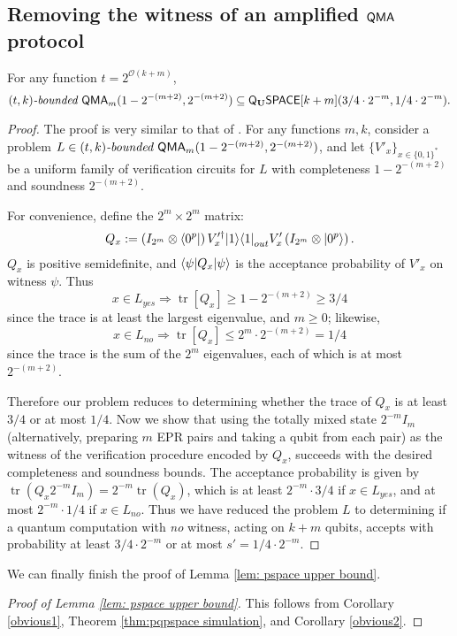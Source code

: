 \documentclass[a4paper,UKenglish]{lipics-v2016}
\newcommand\QMA{{\sf{QMA}}}
\newcommand\bddQMA[5]{{\left(#1,#2\right)}\textit{-bounded }\QMA_{#3}(#4,#5)}
\newcommand{\classfont}{\sf}
\newcommand{\Unitary}{\mathbf{U}}
\newcommand{\unitaryQSPACE}[3]{{\classfont{Q}_\Unitary\classfont{SPACE}}[#1](#2,#3)}
\newcommand\bigoh{\mathcal{O}}
\DeclareMathOperator{\tr}{tr}
\begin{document}
\subsection{Removing the witness of an amplified $\QMA$ protocol}\label{app: removingwitness}
\begin{theorem} \label{thm:pqpspace simulation} For any function $t=2^{\bigoh(k+m)}$,
\[
\bddQMA{t}{k}{m}{1-2^{-(m+2)}}{2^{-(m+2)}}\subseteq
\unitaryQSPACE{k+m}{3/4\cdot 2^{-m}}{1/4 \cdot 2^{-m}}.
\]
\end{theorem}
\begin{proof}
The proof is very similar to that of \cite[Theorem 3.6]{mw05}. For any functions $m, k$, consider a problem $L\in\bddQMA{t}{k}{m}{1-2^{-(m+2)}}{2^{-(m+2)}}$, and let $\{V'_x\}_{x\in\{0,1\}^*}$ be a uniform family of verification circuits for $L$ with completeness $1-2^{-(m+2)}$ and soundness $2^{-(m+2)}$. 

For convenience, define the $2^m \times 2^m$ matrix:
\begin{equation}
Q_x := \left(I_{2^m}\otimes {\left\langle{0^p}\right\vert}\right) V'^\dagger_x {\left\vert{1}\right\rangle}{\left\langle{1}\right\vert}_{out} V'_x \left(I_{2^m}\otimes {\left\vert{0^p}\right\rangle}\right).
\end{equation}
$Q_x$ is positive semidefinite, and ${\left\langle{\psi}\right\vert}Q_x{\left\vert{\psi}\right\rangle}$ is the acceptance probability of $V'_x$ on witness $\psi$. Thus
\begin{equation}
x\in L_{yes} \Rightarrow \tr[Q_x]\ge 1 - 2^{-(m+2)} \ge 3/4
\end{equation}
since the trace is at least the largest eigenvalue, and $m\geq 0$; likewise,
\begin{equation}
x\in L_{no} \Rightarrow \tr[Q_x]\le 2^m \cdot 2^{-(m+2)} = 1/4
\end{equation}
since the trace is the sum of the $2^m$ eigenvalues, each of which is at most $2^{-(m+2)}$. 

Therefore our problem reduces to determining whether the trace of $Q_x$ is at least $3/4$ or at most $1/4$.  Now we show that using the totally mixed state $2^{-m}I_m$ (alternatively, preparing $m$ EPR pairs and taking a qubit from each pair) as the witness of the verification procedure encoded by $Q_x$, succeeds with the desired completeness and soundness bounds.  The acceptance probability is given by
$\tr(Q_x 2^{-m}I_m) = 2^{-m} \tr(Q_x)$,
which is at least $2^{-m} \cdot 3/4$ if $x\in L_{yes}$, and at most $2^{-m} \cdot 1/4$ if $x\in L_{no}$. Thus we have reduced the problem $L$ to determining if a quantum computation with \emph{no} witness, acting on $k+m$ qubits, accepts with probability at least $3/4 \cdot 2^{-m}$ or at most $s'=1/4 \cdot 2^{-m}$.
\end{proof}
We can finally finish the proof of Lemma \ref{lem: pspace upper bound}.
\begin{proof}[Proof of Lemma \ref{lem: pspace upper bound}]
This follows from Corollary \ref{obvious1}, Theorem \ref{thm:pqpspace simulation}, and Corollary \ref{obvious2}.
\end{proof}
\end{document}
